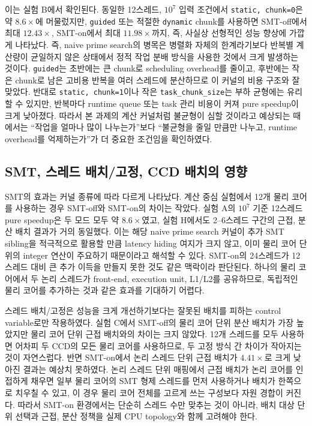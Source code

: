 \documentclass[11pt,a4paper]{article}
\begin{document}
이는 실험 B에서 확인된다. 동일한 12스레드, $10^7$ 입력 조건에서 \texttt{static, chunk=0}은 약 $8.6\times$에 머물렀지만, \texttt{guided} 또는 적절한 \texttt{dynamic} chunk를 사용하면 SMT-off에서 최대 $12.43\times$, SMT-on에서 최대 $11.98\times$까지, 즉, 사실상 선형적인 성능 향상에 가깝게 나타났다. 즉, naive prime search의 병목은 병렬화 자체의 한계라기보다 반복별 계산량이 균일하지 않은 상태에서 정적 작업 분배 방식을 사용한 것에서 크게 발생하는 것이다. \texttt{guided}는 초반에는 큰 chunk로 scheduling overhead를 줄이고, 후반에는 작은 chunk로 남은 고비용 반복을 여러 스레드에 분산하므로 이 커널의 비용 구조와 잘 맞았다.  반대로 \texttt{static, chunk=1}이나 작은 \texttt{task\_chunk\_size}는 부하 균형에는 유리할 수 있지만, 반복마다 runtime queue 또는 task 관리 비용이 커져 pure speedup이 크게
낮아졌다. 따라서 본 과제의 계산 커널처럼 불균형이 심할 것이라고 예상되는 때에서는 ``작업을 얼마나 많이 나누는가''보다
``불균형을 줄일 만큼만 나누고, runtime overhead를 억제하는가''가 더 중요한 조건임을 확인하였다.

\subsection{SMT, 스레드 배치/고정, CCD 배치의 영향}

SMT의 효과는 커널 종류에 따라 다르게 나타났다. 계산 중심 실험에서 12개 물리 코어를 사용하는 경우 SMT-off와 SMT-on의 차이는 작았다. 실험 A의 $10^7$ 기준 12스레드 pure speedup은 두 모드 모두 약 $8.6\times$였고, 실험 H에서도 2--6스레드 구간의 근접, 분산 배치 결과가 거의 동일했다. 이는 해당 naive prime search 커널이 추가 SMT sibling을 적극적으로 활용할 만큼 latency hiding 여지가 크지 않고, 이미 물리 코어 단위의 integer 연산이 주요하기 때문이라고 해석할 수 있다. SMT-on의 24스레드가 12스레드 대비 큰 추가 이득을 만들지 못한 것도 같은 맥락이라 판단된다. 하나의 물리 코어에서 두 논리 스레드가 front-end, execution unit, L1/L2를 공유하므로, 독립적인 물리 코어를 추가하는 것과 같은 효과를 기대하기 어렵다.

스레드 배치/고정은 성능을 크게 개선하기보다는 잘못된 배치를 피하는 control variable로만 작용하였다. 실험 C에서 SMT-off의 물리 코어 단위 분산 배치가 가장 높았지만 물리 코어 단위 근접 배치와의 차이는 크지 않았다. 12개 스레드를 모두 사용하면 어차피 두 CCD의 모든 물리 코어를 사용하므로, 두 고정 방식 간 차이가 작아지는 것이 자연스럽다. 반면 SMT-on에서 논리 스레드 단위 근접 배치가 $4.41\times$로 크게 낮아진 결과는 예상치 못하였다. 논리 스레드 단위 매핑에서 근접 배치가 논리 코어를 인접하게 채우면 일부 물리 코어의 SMT 형제 스레드를 먼저 사용하거나 배치가 한쪽으로 치우칠 수 있고, 이 경우 물리 코어 전체를 고르게 쓰는 구성보다 자원 경합이 커진다. 따라서 SMT-on 환경에서는 단순히 스레드 수만 맞추는 것이 아니라, 배치 대상 단위 선택과 근접, 분산 정책을 실제 CPU topology와 함께 고려해야 한다.
\end{document}
